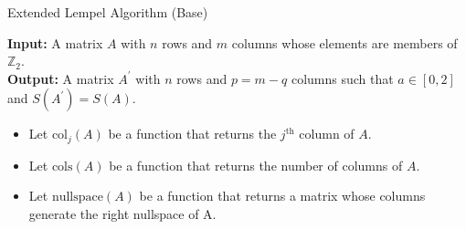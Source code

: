 \documentclass{article}
\theoremstyle{definition}
\theoremstyle{problem}
\theoremstyle{lemma}
\begin{document}
		\begin{algorithm}			
			\caption{Extended Lempel Algorithm (Base)}
			\label{al_1}
			\textbf{Input:} A matrix $A$ with $n$ rows and $m$ columns whose elements are members of $\mathbb{Z}_2$.\\
			\textbf{Output:} A matrix $A^\prime$ with $n$ rows and $p = m-q$ columns such that $a\in\left[0,2\right]$ and $S(A^\prime) = S(A)$.
			\begin{itemize}
				\item Let $\text{col}_j(A)$ be a function that returns the $j^{\text{th}}$ column of $A$.
				\item Let $\text{cols}(A)$ be a function that returns the number of columns of $A$.
				\item Let $\text{nullspace}(A)$ be a function that returns a matrix whose columns generate the right nullspace of A.
			\end{itemize}
			\begin{algorithmic}[1]
				\EndIf
				\EndIf
				\EndFor
				\EndFor
				\EndProcedure
			\end{algorithmic}
		\end{algorithm}
\end{document}
